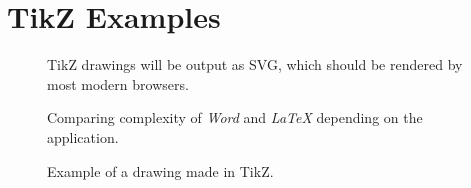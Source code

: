 \section{TikZ Examples}\label{tikz-examples:sec}

\begin{figure}
\centering
{}
\caption{TikZ drawings will be output as SVG, which should be rendered by most modern browsers.}
\end{figure}

\begin{figure}
\centering

\caption{Comparing complexity of \textit{Word} and \textit{LaTeX} depending on the application.}
\end{figure}

\begin{figure}
\centering

\caption{Example of a drawing made in TikZ.}
\end{figure}